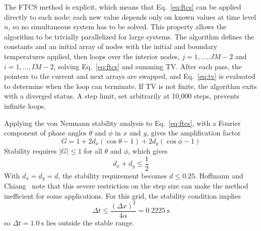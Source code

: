 \documentclass[conf]{new-aiaa}
\begin{document}
The FTCS method is explicit, which means that Eq.~\eqref{eq:ftcs} can be applied directly to each node:
each new value depends only on known values at time level $n$, so no simultaneous system has to be solved. This property allows the algorithm to be trivially
parallelized for large systems. The algorithm defines the constants and an initial array of nodes with the
initial and boundary temperatures applied, then loops over the interior nodes,
$j = 1, \dots, \mathit{JM}-2$ and $i = 1, \dots, \mathit{IM}-2$, solving Eq.~\eqref{eq:ftcs} and summing TV.
After each pass, the pointers to the current and next arrays are swapped, and Eq.~\eqref{eq:tv} is evaluated
to determine when the loop can terminate. If TV is not finite, the algorithm exits with a diverged status.
A step limit, set arbitrarily at 10,000 steps, prevents infinite loops.

Applying the von Neumann stability analysis to Eq.~\eqref{eq:ftcs}, with a Fourier component of phase angles
$\theta$ and $\phi$ in $x$ and $y$, gives the amplification factor~\cite[Sec.~4.4]{hoffmann2000}
\begin{equation}
  G = 1 + 2d_x(\cos\theta - 1) + 2d_y(\cos\phi - 1)
  \label{eq:ftcs-G}
\end{equation}
Stability requires $|G| \le 1$ for all $\theta$ and $\phi$, which gives~\cite[Eq.~(4-71)]{hoffmann2000}
\begin{equation}
  d_x + d_y \le \frac{1}{2}
  \label{eq:ftcs-stab}
\end{equation}
With $d_x = d_y = d$, the stability requirement becomes
$d \le 0.25$. Hoffmann and Chiang~\cite{hoffmann2000} note that this severe restriction on the step size can
make the method inefficient for some applications. For this grid, the stability condition implies
\begin{equation}
  \Delta t \le \frac{(\Delta x)^2}{4\alpha} = \SI{0.2225}{\second}
  \label{eq:ftcs-dtmax}
\end{equation}
so $\Delta t = \SI{1.0}{\second}$ lies outside the stable range.
\end{document}
